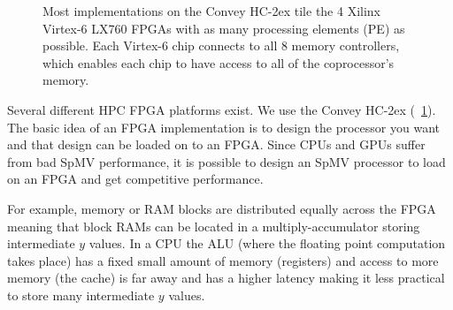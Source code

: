 \begin{figure}
\centering
{}
\caption[High-level diagram of the Convey HC-2ex.]{Most implementations on the Convey HC-2ex tile the 4 Xilinx Virtex-6 LX760 FPGAs with as many processing elements (PE) as possible. Each Virtex-6 chip connects to all 8 memory controllers, which enables each chip to have access to all of the coprocessor's memory.}
\label{fig:highlevel1}
\end{figure}
Several different HPC FPGA platforms exist. We use the Convey HC-2ex (\figurename~\ref{fig:highlevel1}). The basic idea of an FPGA implementation is to design the processor you want and that design can be loaded on to an FPGA. Since CPUs and GPUs suffer from bad SpMV performance, it is possible to design an SpMV processor to load on an FPGA and get competitive performance.
\par For example, memory or RAM blocks are distributed equally across the FPGA meaning that block RAMs can be located in a multiply-accumulator storing intermediate $y$ values. In a CPU the ALU (where the floating point computation takes place) has a fixed small amount of memory (registers) and access to more memory (the cache) is far away and has a higher latency making it less practical to store many intermediate $y$ values.
